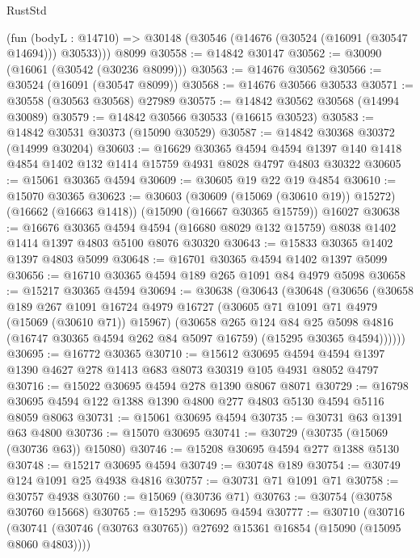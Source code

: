 \begin{lexlean}{RustStd}
\begin{coremodule}
    (fun (bodyL : @14710) => @30148 (@30546 (@14676 (@30524 (@16091 (@30547 @14694))) @30533)))
    @8099
@30558 := @14842 @30147
@30562 := @30090 (@16061 (@30542 (@30236 @8099)))
@30563 := @14676 @30562
@30566 := @30524 (@16091 (@30547 @8099))
@30568 := @14676 @30566 @30533
@30571 := @30558 (@30563 @30568) @27989
@30575 := @14842 @30562 @30568 (@14994 @30089)
@30579 := @14842 @30566 @30533 (@16615 @30523)
@30583 := @14842 @30531 @30373 (@15090 @30529)
@30587 := @14842 @30368 @30372 (@14999 @30204)
@30603 := @16629
    @30365
    @4594
    @4594
    @1397
    @140
    @1418
    @4854
    @1402
    @132
    @1414
    @15759
    @4931
    @8028
    @4797
    @4803
    @30322
@30605 := @15061 @30365 @4594
@30609 := @30605 @19 @22 @19 @4854
@30610 := @15070 @30365
@30623 := @30603
    (@30609 (@15069 (@30610 @19)) @15272)
    (@16662 (@16663 @1418))
    (@15090 (@16667 @30365 @15759))
    @16027
@30638 := @16676
    @30365
    @4594
    @4594
    (@16680 @8029 @132 @15759)
    @8038
    @1402
    @1414
    @1397
    @4803
    @5100
    @8076
    @30320
@30643 := @15833 @30365 @1402 @1397 @4803 @5099
@30648 := @16701 @30365 @4594 @1402 @1397 @5099
@30656 := @16710 @30365 @4594 @189 @265 @1091 @84 @4979 @5098
@30658 := @15217 @30365 @4594
@30694 := @30638
    (@30643
      (@30648
        (@30656
          (@30658
            @189
            @267
            @1091
            @16724
            @4979
            @16727
            (@30605 @71 @1091 @71 @4979 (@15069 (@30610 @71)) @15967)
            (@30658
              @265
              @124
              @84
              @25
              @5098
              @4816
              (@16747 @30365 @4594 @262 @84 @5097 @16759)
              (@15295 @30365 @4594))))))
@30695 := @16772 @30365
@30710 := @15612
    @30695
    @4594
    @4594
    @1397
    @1390
    @4627
    @278
    @1413
    @683
    @8073
    @30319
    @105
    @4931
    @8052
    @4797
@30716 := @15022 @30695 @4594 @278 @1390 @8067 @8071
@30729 := @16798 @30695 @4594 @122 @1388 @1390 @4800 @277 @4803 @5130 @4594 @5116 @8059 @8063
@30731 := @15061 @30695 @4594
@30735 := @30731 @63 @1391 @63 @4800
@30736 := @15070 @30695
@30741 := @30729 (@30735 (@15069 (@30736 @63)) @15080)
@30746 := @15208 @30695 @4594 @277 @1388 @5130
@30748 := @15217 @30695 @4594
@30749 := @30748 @189
@30754 := @30749 @124 @1091 @25 @4938 @4816
@30757 := @30731 @71 @1091 @71
@30758 := @30757 @4938
@30760 := @15069 (@30736 @71)
@30763 := @30754 (@30758 @30760 @15668)
@30765 := @15295 @30695 @4594
@30777 := @30710
    (@30716 (@30741 (@30746 (@30763 @30765)) @27692 @15361 @16854 (@15090 (@15095 @8060 @4803))))

\end{coremodule}
\end{lexlean}
